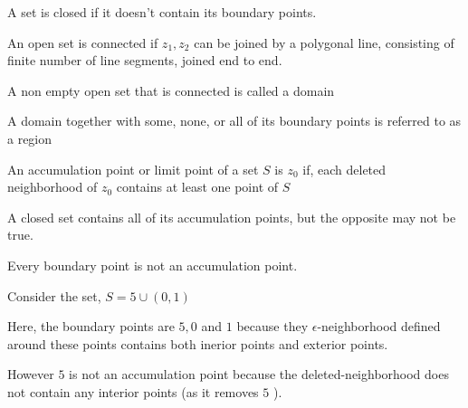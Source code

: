 \begin{definition}
   A set is closed if it doesn't contain its boundary points.
\end{definition}

\begin{definition}
   An open set is connected if $z_1, z_2$ can be joined by a polygonal line, consisting of finite number of line segments, joined end to end.
\end{definition}


\begin{definition}[domain]
   A non empty open set that is connected is called a domain
\end{definition}

\begin{definition}[region]
   A domain together with some, none, or all of its boundary points is referred to as a region
\end{definition}


\begin{definition} An accumulation point or limit point of a set $S$ is  $z_0$ if, each deleted neighborhood of $z_0$ contains at least one point of $S$
\end{definition}
\begin{remark}
   A closed set contains all of its accumulation points, but the opposite may not be true.
\end{remark}
\begin{remark}
   Every boundary point is not an accumulation point.
\end{remark}
\begin{eg}
   Consider the set, $S = {5} \cup (0,1)$

   Here, the boundary points are $5,0$ and $1$ because they  $\epsilon$-neighborhood defined around these points contains both inerior points and exterior points.

   However $5$ is not an accumulation point because the deleted-neighborhood does not contain any interior points (as it removes  $5$ ).
\end{eg}



